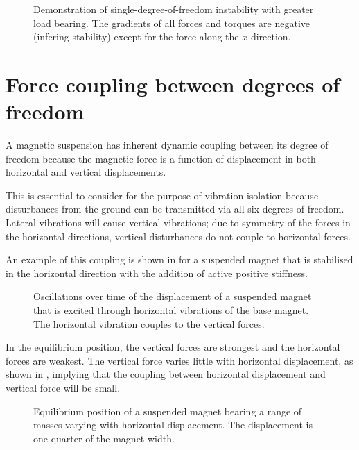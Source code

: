 \begin{figure}
  \caption{
    Demonstration of single-degree-of-freedom instability with greater load bearing.
    The gradients of all forces and torques are negative (infering stability)
    except for the force along the $x$ direction.
  }
\end{figure}


\section{Force coupling between degrees of freedom}

A magnetic suspension has inherent dynamic coupling between its degree of
freedom because the magnetic force is a function of displacement in both
horizontal and vertical displacements.

This is essential to consider for the purpose of vibration isolation because
disturbances from the ground can be transmitted via all six degrees of
freedom. Lateral vibrations will cause vertical vibrations; due to symmetry of
the forces in the horizontal directions, vertical disturbances do not couple
to horizontal forces.

An example of this coupling is shown in  for a
suspended magnet that is stabilised in the horizontal direction with the
addition of active positive stiffness. 

\begin{figure}
  \caption{Oscillations over time of the displacement of a suspended magnet that is excited through horizontal vibrations of the base magnet. The horizontal vibration couples to the vertical forces.}
\end{figure}

In the equilibrium position, the vertical forces are strongest and the
horizontal forces are weakest. The vertical force varies little with
horizontal displacement, as shown in , implying
that the coupling between horizontal displacement and vertical force will be
small.

\begin{figure}
  \caption{Equilibrium position of a suspended magnet bearing a range of
  masses varying with horizontal displacement.
  The displacement is one quarter of the magnet width.}
\end{figure}

